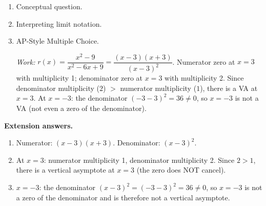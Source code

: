 \documentclass[10pt]{article}
\begin{document}
\begin{enumerate}[itemsep=14pt]
\item Conceptual question.


\item Interpreting limit notation.


\item AP-Style Multiple Choice. 

\textit{Work:} $r(x) = \dfrac{x^2-9}{x^2-6x+9} = \dfrac{(x-3)(x+3)}{(x-3)^2}$.
Numerator zero at $x = 3$ with multiplicity 1; denominator zero at $x = 3$ with multiplicity 2.
Since denominator multiplicity ($2$) $>$ numerator multiplicity ($1$), there is a VA at $x = 3$.
At $x = -3$: the denominator $(-3-3)^2 = 36 \ne 0$, so $x=-3$ is not a VA (not even a zero
of the denominator).

\end{enumerate}

\vspace{0.1in}

\begin{extensionbox}
\textbf{Extension answers.}
\begin{enumerate}[label=(\alph*), itemsep=4pt]
  \item Numerator: $(x-3)(x+3)$. Denominator: $(x-3)^2$.
  \item At $x = 3$: numerator multiplicity 1, denominator multiplicity 2. Since $2 > 1$,
        there is a vertical asymptote at $x = 3$ (the zero does NOT cancel).
  \item $x = -3$: the denominator $(x-3)^2 = (-3-3)^2 = 36 \ne 0$, so $x = -3$ is not
        a zero of the denominator and is therefore not a vertical asymptote.
\end{enumerate}
\end{extensionbox}
\end{document}
